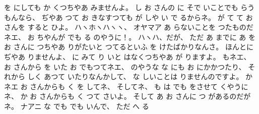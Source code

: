 を
にしても
か
くつちやあ
みませんよ。
%
%
し
お
さんの
に
そで
いことでも
らうもんなら、
%
ぢやあ
つて
お
きなすつても
が
しや
い
で
るからネ。
%
が
て
て
お
さんを
すると
ひよ。
%
ハヽホヽハヽヽ、
%
オヤマア
あ
らないことを
つたものだネエ、
%
お
ちやんが
でも
る
のやうに！。
%
ハヽハ、だが、
%
ただ
あ
までに
あ
を
お
さんに
つちやあ
りがたいと
つてるといふ
を
けたばかりなんさ。
%
ほんとに
ぢやあ
りませんよ、
%
に
みて
り
いと
はなくつちやあ
が
りますよ。
%
もネエ、
%
お
さんから
を
いた
お
でもつてネエ、
%
のやうな
な
にも
お
にかかつたり、
%
それから
しく
あつて
いたりなんかして、
%
な
しいことは
りませんのですよ。
%
かネエ
お
さんからも
く
を
してネ、
%
そしてネ、
%
も
は
でも
をさせて
くやうにネ、
%
か
お
さんからも
く
つて
さいよ。
%
そして
あ
お
さんに
つ
があるのだがネ。
%
ナアニ
な
でも
でも
いんで、
%
ただ
へ
る
